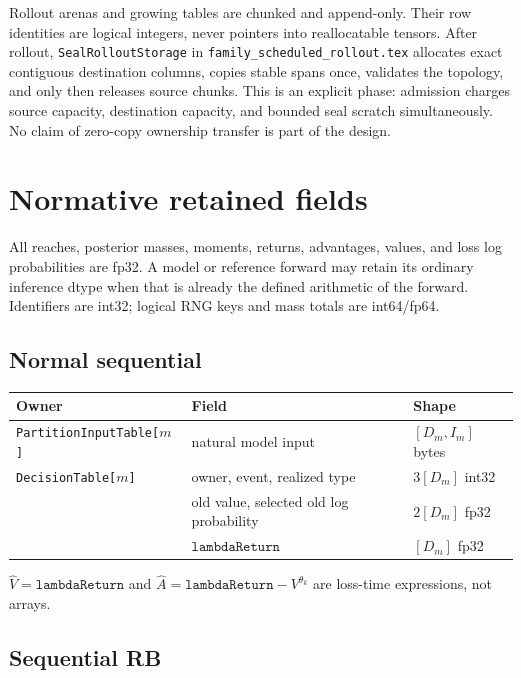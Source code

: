 \documentclass[10pt,a4paper]{article}
\newcommand{\Obj}[1]{\texttt{#1}}
\begin{document}
Rollout arenas and growing tables are chunked and append-only.  Their row
identities are logical integers, never pointers into reallocatable tensors.
After rollout, \Obj{SealRolloutStorage} in
\texttt{family\_scheduled\_rollout.tex} allocates exact contiguous destination
columns, copies stable spans once, validates the topology, and only then
releases source chunks.  This is an explicit phase: admission charges source
capacity, destination capacity, and bounded seal scratch simultaneously.  No
claim of zero-copy ownership transfer is part of the design.

\section{Normative retained fields}

All reaches, posterior masses, moments, returns, advantages, values, and loss
log probabilities are fp32.  A model or reference forward may retain its
ordinary inference dtype when that is already the defined arithmetic of the
forward.  Identifiers are int32; logical RNG keys and mass totals are int64/fp64.

\subsection*{Normal sequential}

\begin{center}
\begin{tabular}{p{}p{}p{}}
\toprule
Owner & Field & Shape \\
\midrule
\Obj{PartitionInputTable[$m$]} & natural model input & $[D_m,I_m]$ bytes \\
\Obj{DecisionTable[$m$]} & owner, event, realized type & $3[D_m]$ int32 \\
& old value, selected old log probability & $2[D_m]$ fp32 \\
& $\mathtt{lambdaReturn}$ & $[D_m]$ fp32 \\
\bottomrule
\end{tabular}
\end{center}
$\widehat V=\mathtt{lambdaReturn}$ and
$\widehat A=\mathtt{lambdaReturn}-V^{\theta_k}$ are loss-time
expressions, not arrays.

\subsection*{Sequential RB}
\end{document}
